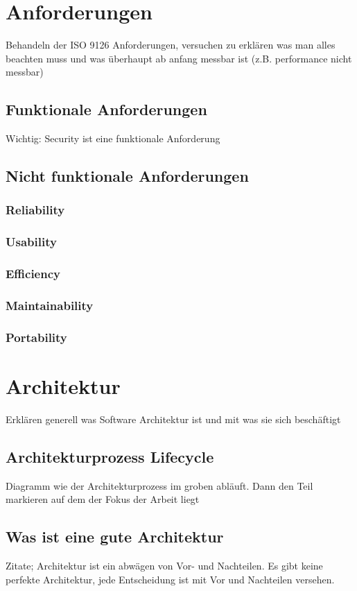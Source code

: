 \documentclass[Master,MSE,german]{twbook}
\begin{document}
\chapter{Anforderungen}
Behandeln der ISO 9126 Anforderungen, versuchen zu erklären was man alles beachten muss und was überhaupt ab anfang messbar ist (z.B. performance nicht messbar)

\section{Funktionale Anforderungen}
Wichtig: Security ist eine funktionale Anforderung

\section{Nicht funktionale Anforderungen}
\subsection{Reliability}
\subsection{Usability}
\subsection{Efficiency}
\subsection{Maintainability}
\subsection{Portability}

\chapter{Architektur}
Erklären generell was Software Architektur ist und mit was sie sich beschäftigt

\section{Architekturprozess Lifecycle}
Diagramm wie der Architekturprozess im groben abläuft. Dann den Teil markieren auf dem der Fokus der Arbeit liegt

\section{Was ist eine gute Architektur}
Zitate; Architektur ist ein abwägen von Vor- und Nachteilen. Es gibt keine perfekte Architektur, jede Entscheidung ist mit Vor und Nachteilen versehen.
\end{document}
